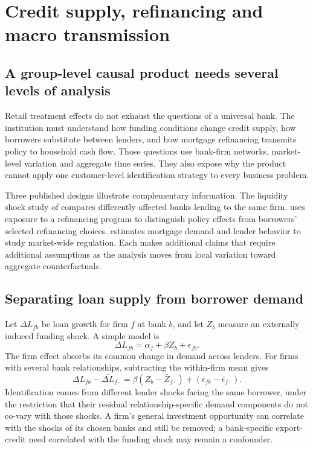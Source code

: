 \chapter{Credit supply, refinancing and macro transmission}\label{ch:credit}
\section{A group-level causal product needs several levels of analysis}
Retail treatment effects do not exhaust the questions of a universal bank.
The institution must understand how funding conditions change credit supply,
how borrowers substitute between lenders, and how mortgage refinancing
transmits policy to household cash flow. Those questions use bank-firm
networks, market-level variation and aggregate time series. They also expose
why the product cannot apply one customer-level identification strategy
to every business problem.

Three published designs illustrate complementary information. The liquidity
shock study of \citet{mian2006} compares differently affected banks lending
to the same firm. \citet{agarwal2020} uses exposure to a refinancing
program to distinguish policy effects from borrowers' selected refinancing
choices. \citet{benetton2021} estimates mortgage demand and lender behavior
to study market-wide regulation. Each makes additional claims that require
additional assumptions as the analysis moves from local variation toward
aggregate counterfactuals.

\section{Separating loan supply from borrower demand}
Let $\Delta L_{fb}$ be loan growth for firm $f$ at bank $b$, and
let $Z_b$ measure an externally induced funding shock. A simple model is
\begin{equation}
 \Delta L_{fb}=\alpha_f+\beta Z_b+\epsilon_{fb}.
 \label{eq:bankfirm}
\end{equation}
The firm effect absorbs its common change in demand across lenders. For
firms with several bank relationships, subtracting the within-firm mean
gives
\[
 \Delta L_{fb}-\overline{\Delta L}_{f\cdot}
 =\beta(Z_b-\bar Z_{f\cdot})+
   (\epsilon_{fb}-\bar\epsilon_{f\cdot}).
\]
Identification comes from different lender shocks facing the same borrower,
under the restriction that their residual relationship-specific demand
components do not co-vary with those shocks. A firm's general investment
opportunity can correlate with the shocks of its chosen banks and still
be removed; a bank-specific export-credit need correlated with the funding
shock may remain a confounder.

